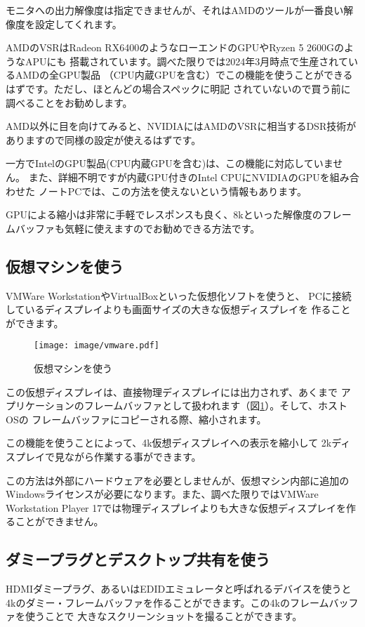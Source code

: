 モニタへの出力解像度は指定できませんが、それはAMDのツールが一番良い解像度を設定してくれます。


AMDのVSRはRadeon RX6400のようなローエンドのGPUやRyzen 5 2600GのようなAPUにも
搭載されています。調べた限りでは2024年3月時点で生産されているAMDの全GPU製品
（CPU内蔵GPUを含む）でこの機能を使うことができるはずです。ただし、ほとんどの場合スペックに明記
されていないので買う前に調べることをお勧めします。

AMD以外に目を向けてみると、NVIDIAにはAMDのVSRに相当するDSR技術がありますので同様の設定が使えるはずです。

一方でIntelのGPU製品(CPU内蔵GPUを含む)は、この機能に対応していません。
また、詳細不明ですが内蔵GPU付きのIntel CPUにNVIDIAのGPUを組み合わせた
ノートPCでは、この方法を使えないという情報もあります。

GPUによる縮小は非常に手軽でレスポンスも良く、8kといった解像度のフレームバッファも気軽に使えますのでお勧めできる方法です。

\subsection{仮想マシンを使う}
VMWare WorkstationやVirtualBoxといった仮想化ソフトを使うと、
PCに接続しているディスプレイよりも画面サイズの大きな仮想ディスプレイを
作ることができます。

\begin{figure}[btp]
  \begin{center}
    \texttt{[image: image/vmware.pdf]}
    \caption{仮想マシンを使う} \label{fig:vm}
  \end{center}
\end{figure}


この仮想ディスプレイは、直接物理ディスプレイには出力されず、あくまで
アプリケーションのフレームバッファとして扱われます（図\ref{fig:vm}）。そして、ホストOSの
フレームバッファにコピーされる際、縮小されます。

この機能を使うことによって、4k仮想ディスプレイへの表示を縮小して
2kディスプレイで見ながら作業する事ができます。

この方法は外部にハードウェアを必要としませんが、仮想マシン内部に追加の
Windowsライセンスが必要になります。また、調べた限りではVMWare Workstation
Player 17では物理ディスプレイよりも大きな仮想ディスプレイを作ることができません。



\subsection{ダミープラグとデスクトップ共有を使う}
HDMIダミープラグ、あるいはEDIDエミュレータと呼ばれるデバイスを使うと
4kのダミー・フレームバッファを作ることができます。この4kのフレームバッファを使うことで
大きなスクリーンショットを撮ることができます。

